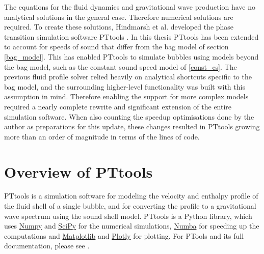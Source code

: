 The equations for the fluid dynamics and gravitational wave production have no analytical solutions in the general case.
Therefore numerical solutions are required.
To create these solutions, Hindmarsh et al. developed the phase transition simulation software PTtools \cite{pttools}.
In this thesis PTtools has been extended to account for speeds of sound that differ from the bag model of section \ref{bag_model}.
This has enabled PTtools to simulate bubbles using models beyond the bag model,
such as the constant sound speed model of \ref{const_cs}.
The previous fluid profile solver relied heavily on analytical shortcuts specific to the bag model,
and the surrounding higher-level functionality was built with this assumption in mind.
Therefore enabling the support for more complex models required a nearly complete rewrite and significant extension of the entire simulation software.
When also counting the speedup optimisations done by the author as preparations for this update,
these changes resulted in PTtools growing more than an order of magnitude in terms of the lines of code.


\section{Overview of PTtools}
PTtools \cite{pttools} is a simulation software for modeling the velocity and enthalpy profile of the fluid shell of a single bubble,
and for converting the profile to a gravitational wave spectrum using the sound shell model.
PTtools is a Python library, which uses
\href{https://numpy.org/}{Numpy}
and
\href{https://scipy.org/}{SciPy}
for the numerical simulations,
\href{https://numba.pydata.org/}{Numba}
for speeding up the computations and
\href{https://matplotlib.org/}{Matplotlib}
and
\href{https://plotly.com/}{Plotly}
for plotting.
For PTools and its full documentation, please see \cite{pttools}.

